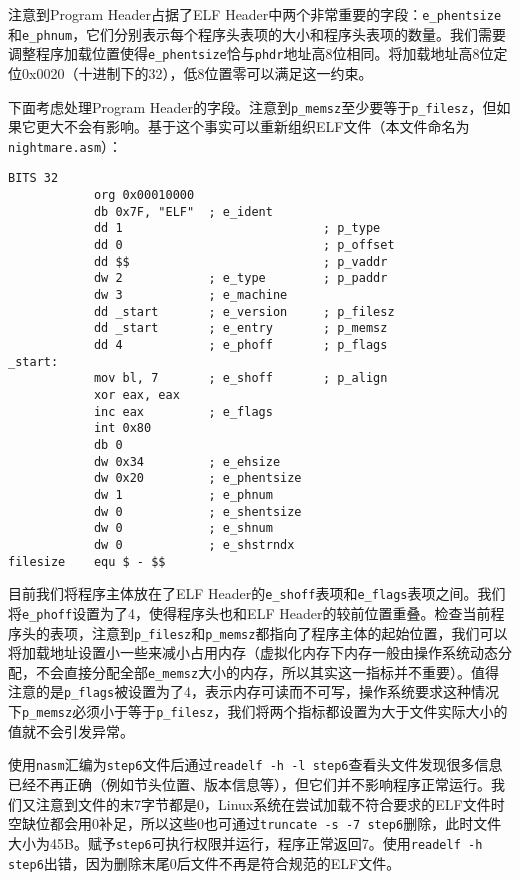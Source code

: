 \documentclass[a4paper, 11pt]{ctexart}
\begin{document}
注意到Program Header占据了ELF Header中两个非常重要的字段：\texttt{e\_phentsize}和\texttt{e\_phnum}，它们分别表示每个程序头表项的大小和程序头表项的数量。我们需要调整程序加载位置使得\texttt{e\_phentsize}恰与\texttt{phdr}地址高8位相同。将加载地址高8位定位0x0020（十进制下的32），低8位置零可以满足这一约束。

下面考虑处理Program Header的字段。注意到\texttt{p\_memsz}至少要等于\texttt{p\_filesz}，但如果它更大不会有影响。基于这个事实可以重新组织ELF文件（本文件命名为\texttt{nightmare.asm}）：

\begin{verbatim}
BITS 32
            org 0x00010000
            db 0x7F, "ELF"  ; e_ident
            dd 1                            ; p_type
            dd 0                            ; p_offset
            dd $$                           ; p_vaddr
            dw 2            ; e_type        ; p_paddr
            dw 3            ; e_machine
            dd _start       ; e_version     ; p_filesz
            dd _start       ; e_entry       ; p_memsz
            dd 4            ; e_phoff       ; p_flags
_start:
            mov bl, 7       ; e_shoff       ; p_align
            xor eax, eax
            inc eax         ; e_flags
            int 0x80
            db 0
            dw 0x34         ; e_ehsize
            dw 0x20         ; e_phentsize
            dw 1            ; e_phnum
            dw 0            ; e_shentsize
            dw 0            ; e_shnum
            dw 0            ; e_shstrndx
filesize    equ $ - $$
\end{verbatim}

目前我们将程序主体放在了ELF Header的\texttt{e\_shoff}表项和\texttt{e\_flags}表项之间。我们将\texttt{e\_phoff}设置为了4，使得程序头也和ELF Header的较前位置重叠。检查当前程序头的表项，注意到\texttt{p\_filesz}和\texttt{p\_memsz}都指向了程序主体的起始位置，我们可以将加载地址设置小一些来减小占用内存（虚拟化内存下内存一般由操作系统动态分配，不会直接分配全部\texttt{e\_memsz}大小的内存，所以其实这一指标并不重要）。值得注意的是\texttt{p\_flags}被设置为了4，表示内存可读而不可写，操作系统要求这种情况下\texttt{p\_memsz}必须小于等于\texttt{p\_filesz}，我们将两个指标都设置为大于文件实际大小的值就不会引发异常。

使用\texttt{nasm}汇编为\texttt{step6}文件后通过\texttt{readelf -h -l step6}查看头文件发现很多信息已经不再正确（例如节头位置、版本信息等），但它们并不影响程序正常运行。我们又注意到文件的末7字节都是0，Linux系统在尝试加载不符合要求的ELF文件时空缺位都会用0补足，所以这些0也可通过\texttt{truncate -s -7 step6}删除，此时文件大小为45B。赋予\texttt{step6}可执行权限并运行，程序正常返回7。使用\texttt{readelf -h step6}出错，因为删除末尾0后文件不再是符合规范的ELF文件。
\end{document}
